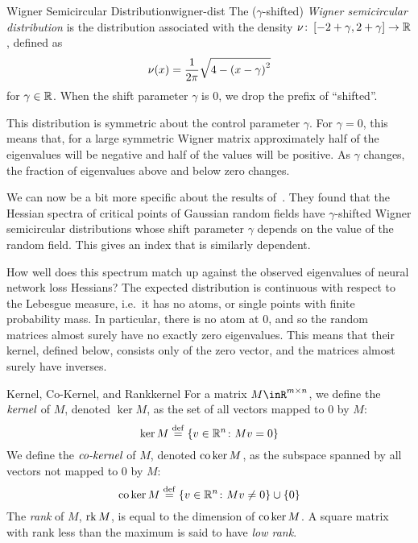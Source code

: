 \documentclass[../../thesis.tex]{subfiles}
\begin{document}
\begin{definition}{Wigner Semicircular Distribution}{wigner-dist}
	The ($\gamma$-shifted) \emph{Wigner semicircular distribution}
	is the distribution associated with the density
	$\nu \colon \left[-2+\gamma, 2+\gamma\right] \to \mathbb{R}$,
	defined as
	\begin{equation}\equationlabel{def-wigner-dist}
		\nu(x) = \frac{1}{2\pi}\sqrt{4 - {(x-\gamma)}^2}
	\end{equation}
	for $\gamma\in\mathbb{R}$.
	When the shift parameter $\gamma$ is $0$,
	we drop the prefix of \enquote{shifted}.
\end{definition}
This distribution is symmetric about the control parameter $\gamma$.
For $\gamma=0$, this means that, for a large symmetric Wigner matrix
approximately half of the eigenvalues will
be negative and half of the values will be positive.
As $\gamma$ changes, the fraction of eigenvalues above and below zero changes.

We can now be a bit more specific about the results of~\cite{bray2007}.
They found that the Hessian spectra of
critical points of Gaussian random fields
have $\gamma$-shifted Wigner semicircular distributions
whose shift parameter $\gamma$ depends on the value of the random field.
This gives an index that is similarly dependent.

How well does this spectrum match up against the observed eigenvalues
of neural network loss Hessians?
The expected distribution is
continuous with respect to the Lebesgue measure,
i.e.~it has no atoms, or single points with finite probability mass.
In particular, there is no atom at $0$,
and so the random matrices almost surely have no exactly zero eigenvalues.
This means that their kernel, defined below, consists only of the zero vector,
and the matrices almost surely have inverses.

\begin{definition}{Kernel, Co-Kernel, and Rank}{kernel}
	For a matrix $M\inR^{m\times n}$,
	we define the $\emph{kernel}$ of $M$,
	denoted $\ker M$,
	as the set of all vectors mapped to $0$ by $M$:
	\begin{equation}\equationlabel{def-ker}
		\ker M \defeq \Set{v \in \R^n \suchthat Mv = 0}
	\end{equation}
	We define the $\emph{co-kernel}$ of $M$,
	denoted $\operatorname*{co}\ker M$,
	as the subspace spanned by all vectors not mapped to $0$ by $M$:
	\begin{equation}\equationlabel{def-coker}
		\co\ker M \defeq \Set{v \in \R^n \suchthat Mv \neq 0} \cup \Set{0}
	\end{equation}
	The \emph{rank} of $M$, $\operatorname*{rk} M$,
	is equal to the dimension of $\operatorname*{co}\ker M$.
	A square matrix with rank less than the maximum
	is said to have \emph{low rank}.
\end{definition}
\end{document}
